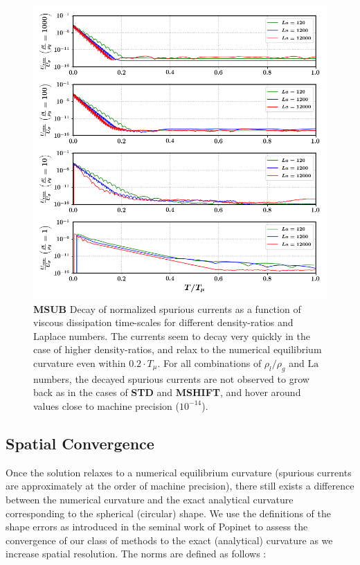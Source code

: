 \begin{figure}[h!]
    \centering
    \includegraphics[]{plots/static_drop/decay_sagar.png}
	\caption{\textbf{MSUB} Decay of normalized spurious currents as a function of viscous dissipation time-scales for different density-ratios and Laplace numbers. The currents seem to decay very quickly in the case of higher density-ratios, and relax to the numerical equilibrium curvature even within $0.2 \cdot T_\mu$. For all combinations of $\rho_l / \rho_g$ and $\textrm{La}$ numbers, the decayed spurious currents are not observed to grow back as in the cases of \textbf{STD} and \textbf{MSHIFT}, and hover around values close to machine precision ($10^{-14}$).}   
    \label{decay_sagar}
\end{figure}



\subsection*{Spatial Convergence}

Once the solution relaxes to a numerical equilibrium curvature (spurious currents are approximately at the order of machine precision), there still exists a difference between the numerical curvature and the exact analytical curvature corresponding to the spherical (circular) shape. We use the definitions of the shape errors as introduced in the seminal work of Popinet \cite{popinet2009accurate} to assess the convergence of our class of methods to the exact (analytical) curvature as we increase spatial resolution. The norms are defined as follows :      

